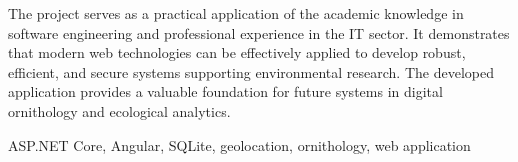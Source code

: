 The project serves as a practical application of the academic knowledge in software engineering and professional experience in the IT sector. It demonstrates that modern web technologies can be effectively applied to develop robust, efficient, and secure systems supporting environmental research. The developed application provides a valuable foundation for future systems in digital ornithology and ecological analytics.


\vspace{10pt}
 ASP.NET Core, Angular, SQLite, geolocation, ornithology, web application